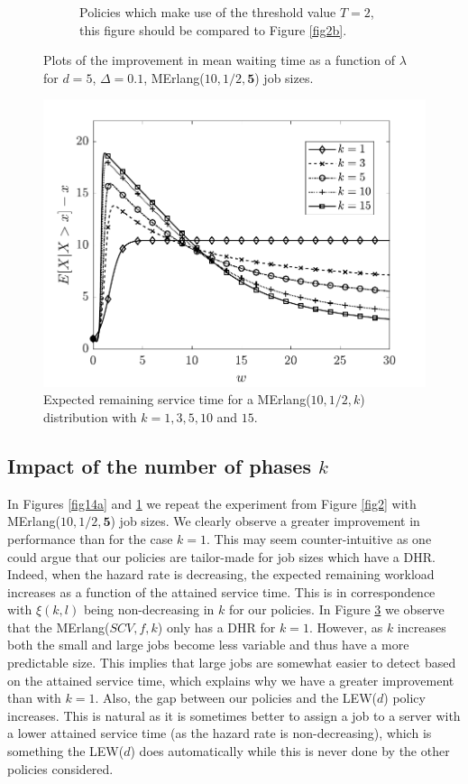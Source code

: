 \documentclass[12pt]{report}
\begin{document}
\begin{figure}[t]
\begin{center}
\begin{subfigure}{.43\textwidth}
\caption{Policies which make use of the threshold value $T=2$, this figure should be compared to Figure \ref{fig2b}.}
\label{fig14b}
\end{subfigure}
\caption{Plots  of the improvement in mean waiting time as a function of $\lambda$ for $d=5$, $\Delta=0.1$, MErlang($10,1/2,\textbf{5}$) job sizes.}
\label{fig14}
\end{center}
\end{figure}

\begin{figure}[t]
	\centering
	\captionsetup{width=.8\linewidth}
	\includegraphics[width=0.5\linewidth]{figures/Chapter7/fig14c.pdf}
	\caption{Expected remaining service time for a MErlang($10,1/2,k$) distribution with $k=1, 3, 5, 10$ and $15$.}
	\label{fig14c}
\end{figure}

\subsection{Impact of the number of phases $k$}
In Figures \ref{fig14a} and \ref{fig14b} we repeat the experiment from Figure \ref{fig2} with MErlang($10, 1/2, \textbf{5}$) job sizes. We clearly observe a greater improvement in performance than for the case $k=1$. This may seem counter-intuitive as one could argue that our policies are tailor-made for job sizes which have a DHR. Indeed, when the hazard rate is decreasing, the expected remaining workload increases as a function of the attained service time. This is in correspondence with $\xi(k,l)$ being non-decreasing in $k$ for our policies. In Figure \ref{fig14c} we observe that the MErlang($SCV, f, k$) only has a DHR for $k = 1$. However, as $k$ increases both the small and large jobs become 
less variable and thus have a more predictable size. This implies that large jobs
are somewhat easier to detect based on the attained service time, which explains why we have a greater improvement than with $k=1$. Also, the gap between our policies and the LEW($d$) policy increases. This is natural as it is sometimes better to assign a job to a server with a lower attained service time (as the hazard rate is non-decreasing), which is something the LEW($d$) does automatically while this is never done by the other policies considered.
\end{document}

